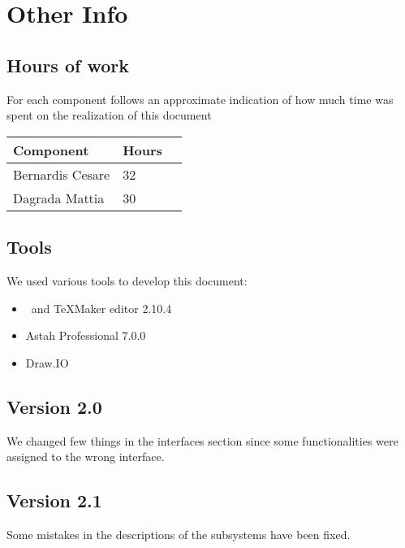 \section{Other Info}
\subsection{Hours of work}
	For each component follows an approximate indication of how much time was
	spent on the realization of this document
	\begin{center}
		\begin{tabular}{ | l | l | p{5cm} |}
			\hline
			Component & Hours 					\\ \hline
			Bernardis Cesare & 32 				\\ \hline
			Dagrada Mattia & 30  				\\ \hline
			\end{tabular}
			\end{center}
			
\subsection{Tools}
	We used various tools to develop this document:
	\begin{itemize}
		\item \LaTeXe \, and TeXMaker editor 2.10.4
		\item Astah Professional 7.0.0
		\item Draw.IO
	\end{itemize}

\subsection{Version 2.0}
We changed few things in the interfaces section since some functionalities were 
assigned to the wrong interface.

\subsection{Version 2.1}
Some mistakes in the descriptions of the subsystems have been fixed.